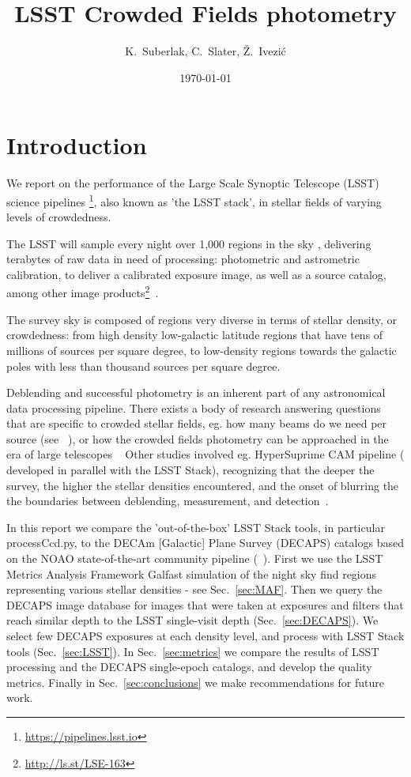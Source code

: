 \documentclass[DM,lsstdraft,toc,usenatbib]{lsstdoc}
\title[Crowded fields ]{LSST  Crowded Fields photometry}
\author{
K.~Suberlak, C.~Slater, \v{Z}.~Ivezi\'c}
\date{\today}
\begin{document}
\maketitle

\section{Introduction}

We report on the performance of the Large Scale Synoptic Telescope (LSST) science pipelines \footnote{\url{https://pipelines.lsst.io}}, also known as 'the LSST stack', in stellar fields of varying levels of crowdedness.

The LSST will sample every night over 1,000  regions in the sky , delivering terabytes of raw data in need of processing: photometric  and astrometric calibration, to deliver a calibrated exposure image, as well as a source catalog, among other image products\footnote{\url{http://ls.st/LSE-163}}~\cite{narayan2018}.

The survey sky is composed of regions very diverse in terms of stellar density, or crowdedness:  from high density low-galactic latitude regions that have tens of millions of sources per square degree, to low-density regions towards the galactic poles with less than thousand sources per square degree. 

Deblending and successful photometry is an inherent part of any astronomical data processing pipeline.  There exists a body of research answering questions that are specific to crowded stellar fields, eg. how many beams do we need per source (see ~\citep{hogg2001}), or how  the crowded fields photometry can be approached in the era of large telescopes ~\cite{olsen2003} Other studies involved eg. HyperSuprime CAM pipeline ( developed in parallel with the LSST Stack), recognizing that the deeper the survey, the higher the stellar densities encountered, and the onset of blurring the the boundaries between deblending, measurement, and detection~\cite{bosch2017}. 

In this report we compare the 'out-of-the-box' LSST Stack tools, in particular processCcd.py, to the DECAm [Galactic] Plane Survey (DECAPS) catalogs based on the NOAO state-of-the-art community pipeline (~\cite{schlafly2017}). First we use the LSST Metrics Analysis Framework Galfast simulation of the night sky find regions representing various stellar densities - see Sec.~\ref{sec:MAF}. Then we query the DECAPS image database for images that were taken at exposures and filters that reach similar depth to the LSST single-visit depth (Sec.~\ref{sec:DECAPS}). We select few DECAPS exposures at each density level, and process with LSST Stack tools (Sec.~\ref{sec:LSST}). In Sec.~\ref{sec:metrics} we compare the results of LSST processing and the DECAPS single-epoch catalogs, and develop the quality metrics.  Finally in Sec.~\ref{sec:conclusions} we make recommendations for future work. 
\end{document}
